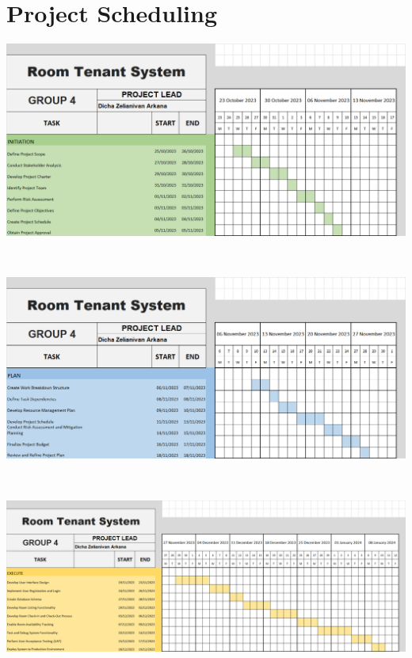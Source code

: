 \documentclass[12pt,titlepage,a4paper]{report}
\begin{document}
    \section{Project Scheduling}
    \begin{turn}{90}
        \includegraphics[width=.95\textheight]{images/figures/gant-Init.png}
    \end{turn}\\
    \begin{turn}{90}
        \includegraphics[width=\textheight]{images/figures/gant-Plan.png}
    \end{turn}\\
    \begin{turn}{90}
        \includegraphics[width=\textheight]{images/figures/gant-Exec.png}
    \end{turn}\\
\end{document}

